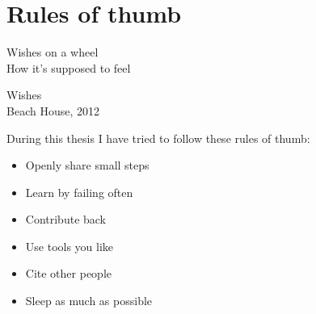 \chapter{Rules of thumb}

\epigraph{Wishes on a wheel \\ How it's supposed to feel}{Wishes \\ Beach House, 2012}

During this thesis I have tried to follow these rules of thumb:

\begin{itemize}
  \item Openly share small steps
  \item Learn by failing often
  \item Contribute back
  \item Use tools you like
  \item Cite other people
  \item Sleep as much as possible
\end{itemize}
